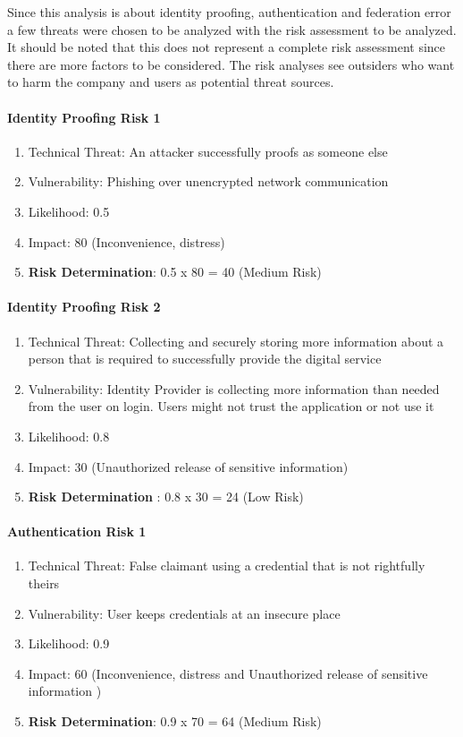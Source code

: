 Since this analysis is about identity proofing, authentication and federation error a few threats were chosen to be analyzed with the risk assessment to be analyzed. It should be noted that this does not represent a complete risk assessment since there are more factors to be considered. The risk analyses see outsiders who want to harm the company and users as potential threat sources. 

\paragraph{Identity Proofing Risk 1}

\begin{enumerate}
	\item Technical Threat: An attacker successfully proofs as someone else
	\item Vulnerability: Phishing over unencrypted network communication
	\item Likelihood: 0.5
	\item Impact: 80 (Inconvenience, distress)
	\item \textbf{Risk Determination}: 0.5 x 80 = 40 (Medium Risk) 
\end{enumerate}

\paragraph{Identity Proofing Risk 2}
\begin{enumerate}
	\item Technical Threat: Collecting and securely storing more information about a person that is required to successfully provide the digital service
	\item Vulnerability: Identity Provider is collecting more information than needed from the user on login. Users might not trust the application or not use it
	\item Likelihood: 0.8
	\item Impact: 30  (Unauthorized release of sensitive information)
	\item \textbf{Risk Determination} : 0.8 x 30 = 24 (Low Risk)
\end{enumerate}


\paragraph{Authentication Risk 1}
\begin{enumerate}
	\item Technical Threat: False claimant using a credential that is not rightfully theirs
	\item Vulnerability: User keeps credentials at an insecure place
	\item Likelihood: 0.9
	\item Impact: 60 (Inconvenience, distress and Unauthorized release of sensitive information )
	\item \textbf{Risk Determination}: 0.9 x 70 = 64 (Medium Risk) 
\end{enumerate}

